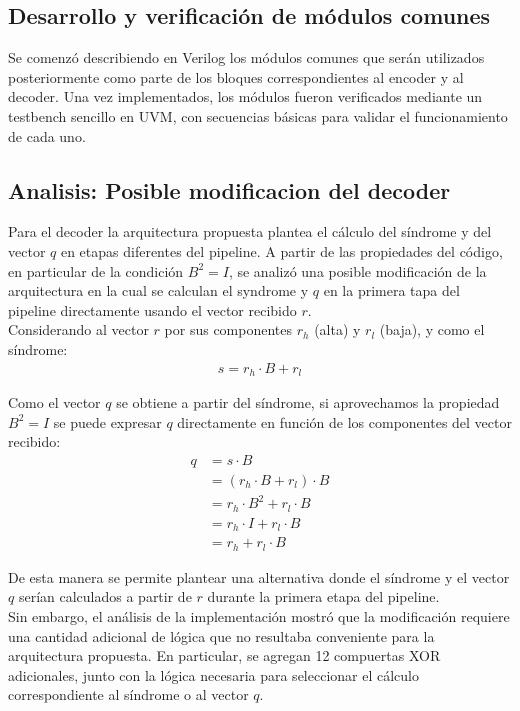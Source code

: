 \subsection{Desarrollo y verificación de módulos comunes}
Se comenzó describiendo en Verilog los módulos comunes que serán utilizados posteriormente como parte de los bloques correspondientes al encoder y al decoder. 
Una vez implementados, los módulos fueron verificados mediante un testbench sencillo en UVM, con secuencias básicas para validar el funcionamiento de cada uno.

\subsection{Analisis: Posible modificacion del decoder}
Para el decoder la arquitectura propuesta plantea el cálculo del síndrome y del vector $q$ en etapas diferentes del pipeline. A partir de las propiedades del código, en particular de la condición $B^2 = I$, se analizó una posible modificación de la arquitectura en la cual se calculan el syndrome y $q$ en la primera  tapa del pipeline directamente usando el vector recibido $r$.\\

Considerando al vector $r$ por sus componentes $r_h$ (alta) y $r_l$ (baja), y como el síndrome:
\begin{align*}
    s = r_h \cdot B + r_l
\end{align*}

Como el vector $q$ se obtiene a partir del síndrome, si aprovechamos la propiedad $B^2 = I$ se puede expresar $q$ directamente en
función de los componentes del vector recibido:
\begin{align*}
    q &= s\cdot B \\
    &= (r_h\cdot B + r_l)\cdot B\\
    &= r_h\cdot B^2 + r_l\cdot B \\
    &= r_h\cdot I + r_l\cdot B \\
    &= r_h + r_l\cdot B
\end{align*}

De esta manera se permite plantear una alternativa donde el síndrome y el vector $q$ serían calculados a partir de $r$ durante la primera etapa del pipeline.\\

Sin embargo, el análisis de la implementación mostró que la modificación requiere una cantidad adicional de lógica que no resultaba conveniente para la arquitectura propuesta. En particular, se agregan 12 compuertas XOR adicionales, junto con la lógica necesaria para seleccionar el cálculo correspondiente al síndrome o al vector $q$.\\

